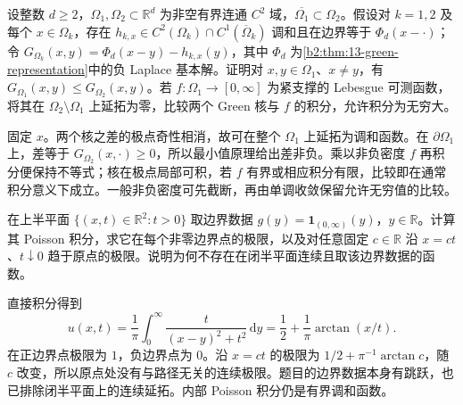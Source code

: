 \begin{exercise}\label{b2:ex:13-domain-monotonicity}
设整数 \(d\geq2\)，\(\Omega_1,\Omega_2\subset\mathbb R^d\) 为非空有界连通 \(C^2\) 域，\(\overline{\Omega_1}\subset\Omega_2\)。假设对 \(k=1,2\) 及每个 \(x\in\Omega_k\)，存在 \(h_{k,x}\in C^2(\Omega_k)\cap C^1(\overline\Omega_k)\) 调和且在边界等于 \(\Phi_d(x-\cdot)\)；令 \(G_{\Omega_k}(x,y)=\Phi_d(x-y)-h_{k,x}(y)\)，其中 \(\Phi_d\) 为\cref{b2:thm:13-green-representation}中的负 Laplace 基本解。证明对 \(x,y\in\Omega_1\)、\(x\ne y\)，有 \(G_{\Omega_1}(x,y)\leq G_{\Omega_2}(x,y)\)。若 \(f:\Omega_1\to[0,\infty]\) 为紧支撑的 Lebesgue 可测函数，将其在 \(\Omega_2\setminus\Omega_1\) 上延拓为零，比较两个 Green 核与 \(f\) 的积分，允许积分为无穷大。
\end{exercise}
\begin{solution}
固定 \(x\)。两个核之差的极点奇性相消，故可在整个 \(\Omega_1\) 上延拓为调和函数。在 \(\partial\Omega_1\) 上，差等于 \(G_{\Omega_2}(x,\cdot)\geq0\)，所以最小值原理给出差非负。乘以非负密度 \(f\) 再积分便保持不等式；核在极点局部可积，若 \(f\) 有界或相应积分有限，比较即在通常积分意义下成立。一般非负密度可先截断，再由单调收敛保留允许无穷值的比较。
\end{solution}

\begin{exercise}\label{b2:ex:13-halfplane-step}
在上半平面 \(\{(x,t)\in\mathbb R^2:t>0\}\) 取边界数据 \(g(y)=\mathbf1_{(0,\infty)}(y)\)，\(y\in\mathbb R\)。计算其 Poisson 积分，求它在每个非零边界点的极限，以及对任意固定 \(c\in\mathbb R\) 沿 \(x=ct\)、\(t\downarrow0\) 趋于原点的极限。说明为何不存在在闭半平面连续且取该边界数据的函数。
\end{exercise}
\begin{solution}
直接积分得到
\[
 u(x,t)=\dfrac1\pi\int_0^\infty\dfrac{t}{(x-y)^2+t^2}\,\mathrm{d}y
 =\dfrac12+\dfrac1\pi\arctan(x/t).
\]
在正边界点极限为 \(1\)，负边界点为 \(0\)。沿 \(x=ct\) 的极限为 \(1/2+\pi^{-1}\arctan c\)，随 \(c\) 改变，所以原点处没有与路径无关的连续极限。题目的边界数据本身有跳跃，也已排除闭半平面上的连续延拓。内部 Poisson 积分仍是有界调和函数。
\end{solution}

